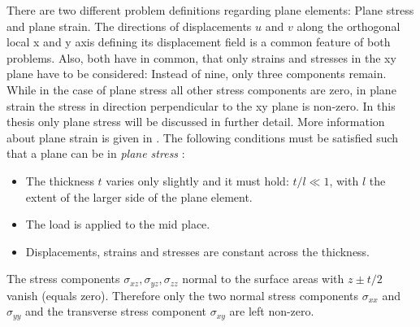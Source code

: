   There are two different problem definitions regarding plane elements: Plane stress and plane strain. The directions of displacements $u$ and $v$ along the orthogonal local x and y axis defining its displacement field is a common feature of both problems. Also, both have in common, that only strains and stresses in the xy plane have to be considered: Instead of nine, only three components remain. While in the case of plane stress all other stress components are zero, in plane strain the stress in direction perpendicular to the xy plane is non-zero. In this thesis only plane stress will be discussed in further detail. More information about plane strain is given in \cite{zienkiewicz2000finite}. %
  The following conditions must be satisfied such that a plane can be in \textit{plane stress} \cite{steinke2005finite}:
  \begin{itemize}
  	\item The thickness $t$ varies only slightly and it must hold: $t/l \ll 1$, with $l$ the extent of the larger side of the plane element.
  	\item The load is applied to the mid place.
  	\item Displacements, strains and stresses are constant across the thickness.
  \end{itemize}
  The stress components $\sigma_{xz},\sigma_{yz},\sigma_{zz}$ normal to the surface areas with $z \pm t/2$ vanish (equals zero). Therefore only the two normal stress components $\sigma_{xx}$ and $\sigma_{yy}$ and the transverse stress component $\sigma_{xy}$ are left non-zero.
    
